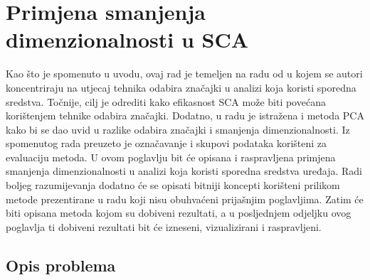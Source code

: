 \documentclass[times, utf8, diplomski]{fer}
\begin{document}
\chapter{Primjena smanjenja dimenzionalnosti u SCA}

Kao što je spomenuto u uvodu, ovaj rad je temeljen na radu od \cite{8836108} u kojem se autori koncentriraju na utjecaj tehnika odabira značajki  u analizi koja koristi sporedna sredstva. Točnije, cilj je odrediti kako efikasnost SCA može biti povećana korištenjem tehnike odabira značajki. Dodatno, u radu je istražena i metoda PCA kako bi se dao uvid u razlike odabira značajki i smanjenja dimenzionalnosti. Iz spomenutog rada preuzeto je označavanje i skupovi podataka korišteni za evaluaciju metoda. U ovom poglavlju bit će opisana i raspravljena primjena smanjenja dimenzionalnosti u analizi koja koristi sporedna sredstva uređaja. Radi boljeg razumijevanja dodatno će se opisati bitniji koncepti korišteni prilikom metode prezentirane u radu koji nisu obuhvaćeni prijašnjim poglavljima. Zatim će biti opisana metoda kojom su dobiveni rezultati, a u posljednjem odjeljku ovog poglavlja ti dobiveni rezultati bit će izneseni, vizualizirani i raspravljeni.

\section{Opis problema}
\end{document}
